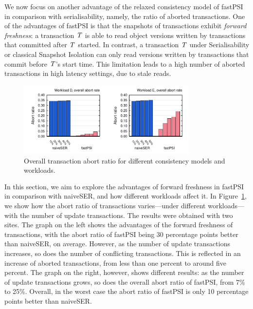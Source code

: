 We now focus on another advantage of the relaxed consistency model of fastPSI in comparison with serialisability, namely, the ratio of aborted transactions. One of the advantages of fastPSI is that the snapshots of transactions exhibit \emph{forward freshness}: a transaction $\mathit{T}$ is able to read object versions written by transactions that committed after $\mathit{T}$ started. In contrast, a transaction $\mathit{T}$ under Serialisability or classical Snapshot Isolation can only read versions written by transactions that commit before $\mathit{T}$'s start time. This limitation leads to a high number of aborted transactions in high latency settings, due to stale reads.

\begin{figure}[t]
\begin{center}
\includegraphics[width=0.8\textwidth]{figures/abort_rate_bench_overall.pdf}
\vspace{-0.75cm}
\end{center}
\caption{Overall transaction abort ratio for different consistency models and workloads.}
\label{fig:raw_abort_rate_overall}
\end{figure}

In this section, we aim to explore the advantages of forward freshness in fastPSI in comparison with naiveSER, and how different workloads affect it. In Figure~\ref{fig:raw_abort_rate_overall}, we show how the abort ratio of transactions varies---under different workloads---with the number of update transactions. The results were obtained with two sites. The graph on the left shows the advantages of the forward freshness of transactions, with the abort ratio of fastPSI being 30 percentage points better than naiveSER, on average. However, as the number of update transactions increases, so does the number of conflicting transactions. This is reflected in an increase of aborted transactions, from less than one percent to around five percent. The graph on the right, however, shows different results: as the number of update transactions grows, so does the overall abort ratio of fastPSI, from 7\% to 25\%. Overall, in the worst case the abort ratio of fastPSI is only 10 percentage points better than naiveSER.

